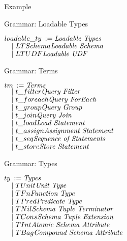 \begin{frame}{Example}
\begin{frame}{Grammar: Loadable Types}
\centering
	\begin{flushleft}
	$ loadable\_ty \::= \hfill \textnormal{\emph{Loadable Types}}\hfill$\\
	$ \quad \mid LTSchema\hfill \textnormal{\emph{Loadable Schema}}\hfill$\\
   	$ \quad \mid LTUDF \hfill \textnormal{\emph{Loadable UDF}}\hfill$\\
	\end{flushleft}
\end{frame}

\begin{frame}{Grammar: Terms}
\centering
	\begin{flushleft}
	$ tm \::= \hfill \textnormal{\emph{Terms}}\hfill$\\
	$ \quad \mid t\_filter\hfill \textnormal{\emph{Query Filter}}\hfill$\\
   	$ \quad \mid t\_foreach \hfill \textnormal{\emph{Query ForEach}}\hfill$\\
     	$ \quad \mid t\_group \hfill \textnormal{\emph{Query Group}}\hfill$\\
     	$ \quad \mid t\_join \hfill \textnormal{\emph{Query Join}}\hfill$\\
     	$ \quad \mid t\_load \hfill \textnormal{\emph{Load Statement}}\hfill$\\
   	$ \quad \mid t\_assign \hfill \textnormal{\emph{Assignment Statement}}\hfill$\\
     	$ \quad \mid t\_seq \hfill \textnormal{\emph{Sequence of Statements}}\hfill$\\
     	$ \quad \mid t\_store \hfill \textnormal{\emph{Store Statement}}\hfill$\\
	\end{flushleft}
\end{frame}

\begin{frame}{Grammar: Types}
\centering
	\begin{flushleft}
	$ ty \::= \hfill \textnormal{\emph{Types}}\hfill$\\
	$ \quad \mid TUnit\hfill \textnormal{\emph{Unit Type}}\hfill$\\
   	$ \quad \mid TFn \hfill \textnormal{\emph{Function Type}}\hfill$\\
     	$ \quad \mid TPred \hfill \textnormal{\emph{Predicate Type}}\hfill$\\
     	$ \quad \mid TNil \hfill \textnormal{\emph{Schema Tuple Terminator}}\hfill$\\
     	$ \quad \mid TCons \hfill \textnormal{\emph{Schema Tuple Extension}}\hfill$\\
   	$ \quad \mid TInt \hfill \textnormal{\emph{Atomic Schema Attribute}}\hfill$\\
     	$ \quad \mid TBag \hfill \textnormal{\emph{Compound Schema Attribute}}\hfill$\\
	\end{flushleft}
\end{frame}


\end{frame}
